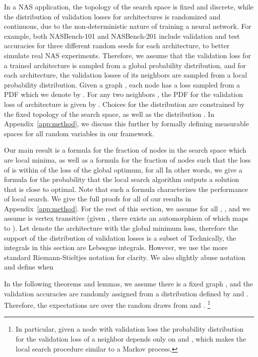 \documentclass[11pt]{article}
\numberwithin{equation}{section}
\numberwithin{figure}{section}
\theoremstyle{plain}
\theoremstyle{definition}
\begin{document}
In a NAS application,
the topology of the search space is fixed and discrete, 
while the distribution of validation losses for architectures is randomized and continuous,
due to the non-deterministic nature of training a neural network.
For example, both NASBench-101 and NASBench-201 include validation and test accuracies 
for three different random seeds for each architecture, to better simulate real NAS experiments.
Therefore, we assume that the validation loss for a trained architecture is sampled from
a global probability distribution, and for each architecture, 
the validation losses of its neighbors are sampled from a local probability distribution.
Given a graph , each node  has a loss 
 sampled from a PDF which we denote by . 
For any two neighbors , the PDF for the validation loss  
of architecture  is given by .
Choices for the distribution  are constrained by the 
fixed topology of the search space, as well as the distribution .
In Appendix~\ref{app:method}, we discuss this further by formally defining
measurable spaces for all random variables in our framework.


Our main result is a formula for the fraction of nodes in the search space which are local
minima, as well as a formula for the fraction of nodes  such that the loss of  
is within  of the loss of the global optimum, for all 
In other words, we give a formula for the probability that the local search algorithm 
outputs a solution that is close to optimal.
Note that such a formula characterizes the performance of local search.
We give the full proofs for all of our results in Appendix~\ref{app:method}.
For the rest of this section, 
we assume for all , , and
we assume  is vertex transitive
(given , there exists an automorphism of  which maps  to ).
Let  denote the architecture with the global minimum loss, therefore
the support of the distribution of validation losses is a subset of  
Technically, the integrals in this section are Lebesgue integrals. However, we use the more standard Riemann-Stieltjes notation for clarity. We also slightly abuse notation and
define  when 

In the following theorems and lemmas, we assume there is a fixed graph , and the 
validation accuracies are randomly assigned from a distribution defined by  
and . Therefore, the expectations are over the random draws from  and .
\footnote{
In particular, given a node  with validation loss 
the probability distribution for the validation loss of a neighbor depends only 
on  and , which makes the local search procedure similar to a 
Markov process.
}
\end{document}

